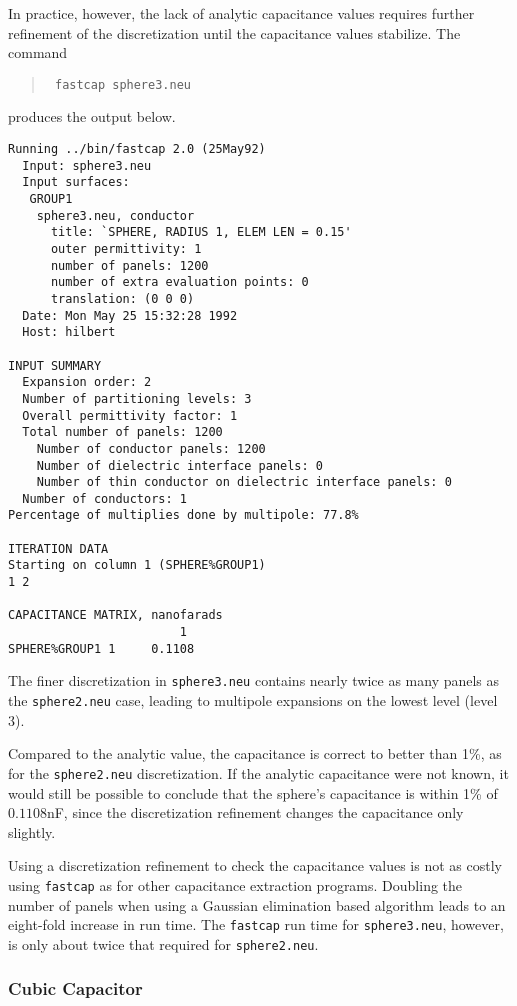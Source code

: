 In practice, however, the lack of analytic capacitance values
requires further refinement of the discretization until the capacitance
values stabilize. 
The command
\begin{quote}\tt
fastcap sphere3.neu
\end{quote}
produces the output below.
\begin{verbatim}
Running ../bin/fastcap 2.0 (25May92)
  Input: sphere3.neu
  Input surfaces:
   GROUP1
    sphere3.neu, conductor
      title: `SPHERE, RADIUS 1, ELEM LEN = 0.15'
      outer permittivity: 1
      number of panels: 1200
      number of extra evaluation points: 0
      translation: (0 0 0)
  Date: Mon May 25 15:32:28 1992
  Host: hilbert

INPUT SUMMARY
  Expansion order: 2
  Number of partitioning levels: 3
  Overall permittivity factor: 1
  Total number of panels: 1200
    Number of conductor panels: 1200
    Number of dielectric interface panels: 0
    Number of thin conductor on dielectric interface panels: 0
  Number of conductors: 1
Percentage of multiplies done by multipole: 77.8%

ITERATION DATA
Starting on column 1 (SPHERE%GROUP1)
1 2

CAPACITANCE MATRIX, nanofarads
                        1
SPHERE%GROUP1 1     0.1108
\end{verbatim}
The finer discretization in {\tt sphere3.neu} contains nearly twice as
many panels as the {\tt sphere2.neu} case, leading to multipole
expansions on the lowest level (level 3).

Compared to the analytic value, the capacitance is correct
to better than 1\%, as for the {\tt sphere2.neu} discretization.
If the analytic capacitance were not known, it would still be possible to
conclude that the sphere's capacitance is within 1\% of $0.1108$nF, since
the discretization refinement changes the capacitance only slightly.

Using a discretization refinement to check the capacitance values is
not as costly using {\tt fastcap} as for other capacitance extraction
programs. Doubling the number of panels when using a
Gaussian elimination based algorithm leads to an eight-fold increase in run
time.
The {\tt fastcap} run time for {\tt sphere3.neu}, however, 
is only about twice that required for {\tt sphere2.neu}.

\subsubsection{Cubic Capacitor}
\label{cubgen}

